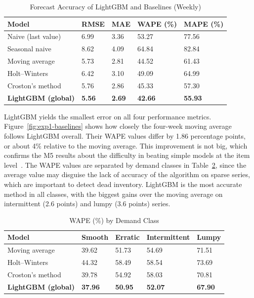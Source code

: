 \documentclass{StockSense}
\begin{document}
\begin{table}[!htbp]
\centering
\caption{Forecast Accuracy of LightGBM and Baselines (Weekly)}
\label{tab:exp1}
\begin{tabular}{|l|l|l|l|l|}
\hline
\textbf{Model} & \textbf{RMSE} & \textbf{MAE} & \textbf{WAPE (\%)} & \textbf{MAPE (\%)} \\ \hline
Naive (last value) & 6.99 & 3.36 & 53.27 & 77.56 \\ \hline
Seasonal naive & 8.62 & 4.09 & 64.84 & 82.84 \\ \hline
Moving average & 5.73 & 2.81 & 44.52 & 61.43 \\ \hline
Holt--Winters & 6.42 & 3.10 & 49.09 & 64.99 \\ \hline
Croston's method & 5.76 & 2.86 & 45.33 & 57.30 \\ \hline
\textbf{LightGBM (global)} & \textbf{5.56} & \textbf{2.69} & \textbf{42.66} & \textbf{55.93} \\ \hline
\end{tabular}
\par\vspace{3pt}{\small These are tentative results and the final results will be written in FYP-2.}
\end{table}

LightGBM yields the smallest error on all four performance metrics. Figure~\ref{fig:exp1-baselines} shows how closely the four-week moving average follows LightGBM overall. Their WAPE values differ by 1.86 percentage points, or about 4\% relative to the moving average. This improvement is not big, which confirms the M5 results about the difficulty in beating simple models at the item level~\cite{makridakis2022m5}. The WAPE values are separated by demand classes in Table~\ref{tab:exp1-class}, since the average value may disguise the lack of accuracy of the algorithm on sparse series, which are important to detect dead inventory. LightGBM is the most accurate method in all classes, with the biggest gains over the moving average on intermittent (2.6 points) and lumpy (3.6 points) series.

\begin{table}[!htbp]
\centering
\caption{WAPE (\%) by Demand Class}
\label{tab:exp1-class}
\begin{tabular}{|l|l|l|l|l|}
\hline
\textbf{Model} & \textbf{Smooth} & \textbf{Erratic} & \textbf{Intermittent} & \textbf{Lumpy} \\ \hline
Moving average & 39.62 & 51.73 & 54.69 & 71.51 \\ \hline
Holt--Winters & 44.32 & 58.49 & 58.54 & 73.69 \\ \hline
Croston's method & 39.78 & 54.92 & 58.03 & 70.81 \\ \hline
\textbf{LightGBM (global)} & \textbf{37.96} & \textbf{50.95} & \textbf{52.07} & \textbf{67.90} \\ \hline
\end{tabular}
\par\vspace{3pt}{\small These are tentative results and the final results will be written in FYP-2.}
\end{table}
\end{document}
